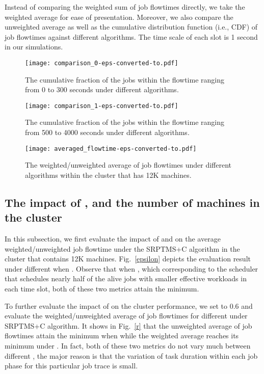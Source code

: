 \documentclass[10pt,conference,compsocconf,letterpaper]{IEEEtran}
\begin{document}
Instead of comparing the weighted sum of job flowtimes directly, we take the weighted average for ease of presentation. Moreover, we also compare the unweighted average as well as the cumulative distribution function (i.e., CDF) of job flowtimes against different algorithms. The time scale of each slot is 1 second in our simulations.

\begin{figure*}
\centering
\begin{minipage}{.32\textwidth}
\centering
\texttt{[image: comparison\_0-eps-converted-to.pdf]}
\caption{The cumulative fraction of the jobs within
the  flowtime ranging from 0 to 300 seconds under different algorithms.}
\label{big_cmf}
\end{minipage}\hfill
\begin{minipage}{.32\textwidth}
\centering
\texttt{[image: comparison\_1-eps-converted-to.pdf]}
\caption{The cumulative fraction of the jobs within
the flowtime ranging from 500 to 4000 seconds under different algorithms.}
\label{small_cmf}
\end{minipage}\hfill
\begin{minipage}{.32\textwidth}
\centering
\texttt{[image: averaged\_flowtime-eps-converted-to.pdf]}
\caption{The weighted/unweighted average of job flowtimes under different algorithms within the cluster that has 12K machines.}
\label{averagedflowtime}
\end{minipage}
\vspace{-1.0em}
\end{figure*}


\subsection{The impact of ,  and the number of machines in the cluster}
In this subsection, we first evaluate the impact of  and  on the average  weighted/unweighted job flowtime under the SRPTMS+C algorithm in the cluster that
contains 12K machines.  Fig.~\ref{epsilon} depicts the evaluation result under different  when . Observe that when , which corresponding to the scheduler that schedules nearly half of the alive jobs with smaller effective workloads in each time slot, both of these two metrics attain the minimum. 

To further evaluate the impact of  on the cluster performance, we set  to 0.6 and evaluate the weighted/unweighted average of job flowtimes for different  under SRPTMS+C algorithm. It shows in Fig.~\ref{r} that the unweighted average of job flowtimes attain the minimum when  while the weighted average reaches its minimum under .
In fact, both of these two metrics do not vary much between different , the major reason is that the variation of task duration within each job phase for this particular job trace is small.
\end{document}
